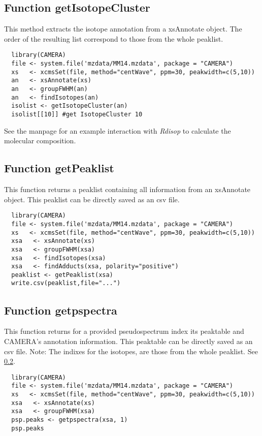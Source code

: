\documentclass[a4paper,12pt]{article}
\newcommand{\Rpackage}[1]{{\textit{#1}}}
\begin{document}
\subsection{Function getIsotopeCluster}
\label{sec:getIsotopeCluster}
This method extracts the isotope annotation from a xsAnnotate object. The order
of the resulting list correspond to those from the whole peaklist.

\begin{verbatim}
  library(CAMERA)
  file <- system.file('mzdata/MM14.mzdata', package = "CAMERA")
  xs   <- xcmsSet(file, method="centWave", ppm=30, peakwidth=c(5,10))
  an   <- xsAnnotate(xs)
  an   <- groupFWHM(an)
  an   <- findIsotopes(an) 
  isolist <- getIsotopeCluster(an)
  isolist[[10]] #get IsotopeCluster 10
\end{verbatim}

See the manpage for an example interaction with \Rpackage{Rdisop} to
calculate the molecular composition.

\subsection{Function getPeaklist}
\label{sec:getPeaklist}
This function returns a peaklist containing all information from an xsAnnotate
object. This peaklist can be directly saved as an csv file.

\begin{verbatim}
  library(CAMERA)
  file <- system.file('mzdata/MM14.mzdata', package = "CAMERA")
  xs   <- xcmsSet(file, method="centWave", ppm=30, peakwidth=c(5,10))
  xsa   <- xsAnnotate(xs)
  xsa   <- groupFWHM(xsa)
  xsa   <- findIsotopes(xsa)
  xsa   <- findAdducts(xsa, polarity="positive")
  peaklist <- getPeaklist(xsa)
  write.csv(peaklist,file="...")
\end{verbatim}

\subsection{Function getpspectra}
\label{sec:getpspectra}
This function returns for a provided pseudospectrum index its peaktable and
CAMERA's annotation information. This peaktable can be directly saved as an
csv file.
Note: The indixes for the isotopes, are those from the whole peaklist. See
\ref{sec:getPeaklist}.
\begin{verbatim}
  library(CAMERA)
  file <- system.file('mzdata/MM14.mzdata', package = "CAMERA")
  xs   <- xcmsSet(file, method="centWave", ppm=30, peakwidth=c(5,10))
  xsa   <- xsAnnotate(xs)
  xsa   <- groupFWHM(xsa)
  psp.peaks <- getpspectra(xsa, 1)
  psp.peaks
\end{verbatim}
\end{document}
